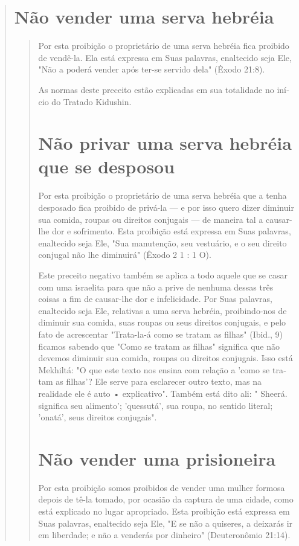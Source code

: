 \begin{quote}
\section{Não vender uma serva hebréia}

\begin{quote}
Por esta proibição o proprietário de uma serva hebréia fica proibido de
vendê-la. Ela está expressa em Suas palavras, enaltecido seja Ele, "Não
a po­derá vender após ter-se servido dela" (Êxodo 21:8).

As normas deste preceito estão explicadas em sua totalidade no iní­cio
do Tratado Kidushin.

\section{Não privar uma serva hebréia que se desposou}

Por esta proibição o proprietário de uma serva hebréia que a tenha
desposado fica proibido de privá-la --- e por isso quero dizer diminuir
sua co­mida, roupas ou direitos conjugais --- de maneira tal a
causar-lhe dor e sofri­mento. Esta proibição está expressa em Suas
palavras, enaltecido seja Ele, "Sua manutenção, seu vestuário, e o seu
direito conjugal não lhe diminuirá" (Êxodo 2 1 : 1 O).

Este preceito negativo também se aplica a todo aquele que se casar com
uma israelita para que não a prive de nenhuma dessas três coisas a fim
de causar-lhe dor e infelicidade. Por Suas palavras, enaltecido seja Ele,
relativas a uma serva hebréia, proibindo-nos de diminuir sua comida,
suas roupas ou seus direitos conjugais, e pelo fato de acrescentar
"Trata-la-á como se tratam as fi­lhas" (Ibid., 9) ficamos sabendo que
"Como se tratam as filhas" significa que não devemos diminuir sua
comida, roupas ou direitos conjugais. Isso está
Mekhiltá: "O que este
texto nos ensina com relação a 'como se tra­tam as filhas'? Ele serve
para esclarecer outro texto, mas na realidade ele é auto • explicativo".
Também está dito ali: " Sheerá. significa seu
alimento'; 'quessu­tá', sua roupa, no sentido literal; 'onatá', seus
direitos conjugais".

\section{Não vender uma prisioneira}

Por esta proibição somos proibidos de vender uma mulher formosa depois
de tê-la tomado, por ocasião da captura de uma cidade, como está
expli­cado no lugar apropriado. Esta proibição está expressa em Suas
palavras, enal­tecido seja Ele, "E se não a quiseres, a deixarás ir em
liberdade; e não a vende­rás por dinheiro" (Deuteronômio 21:14).
\end{quote}


\end{quote}
